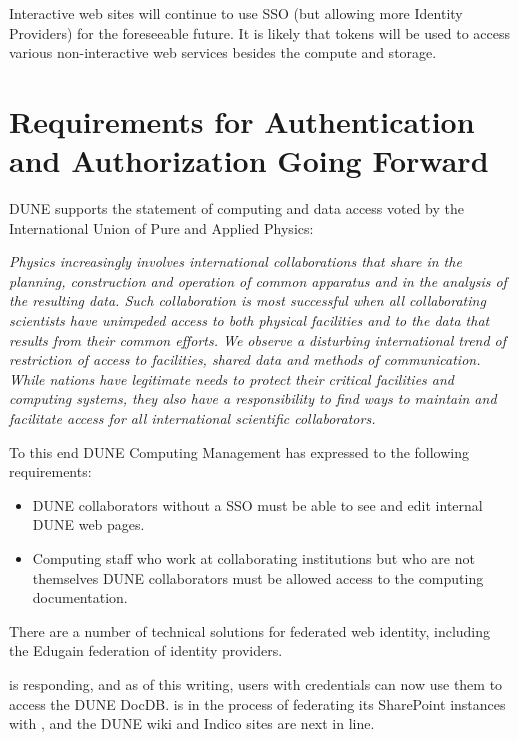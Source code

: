 \documentclass[../main-v1.tex]{subfiles}
\begin{document}
Interactive web sites will continue to use %
 SSO (but allowing more Identity Providers)
for the foreseeable future.  It is likely that  tokens will be used to access various non-interactive web
services besides the compute and storage. 
 

\section{Requirements for Authentication and Authorization Going Forward}

DUNE supports the statement of computing and data access voted by the International Union of Pure and Applied Physics:

\textit{Physics increasingly involves international collaborations that share in the planning, construction and operation of common apparatus and in the analysis of the resulting data. Such collaboration is most successful when all collaborating scientists have unimpeded access to both physical facilities and to the data that results from their common efforts.  We observe a disturbing international trend of restriction of access to facilities,  shared data and methods of communication.  While nations have legitimate needs to protect their critical facilities  and computing systems, they also have a responsibility to find ways to maintain and facilitate access for all international scientific collaborators.}

To this end DUNE Computing Management has expressed to  the following requirements:

\begin{itemize}
    \item DUNE collaborators without a  SSO must be able to see and edit internal DUNE web pages.  
\item Computing staff who work at collaborating institutions but who are not themselves DUNE collaborators must be allowed access to the computing documentation.
 
\end{itemize}
There are a number of technical solutions for federated web identity, including the Edugain federation of identity providers. 

 is responding, and as of this writing, users with  credentials can now use them to access the DUNE DocDB.  is in the process of federating its SharePoint instances with , and the DUNE wiki and Indico sites are next in line.
\end{document}
